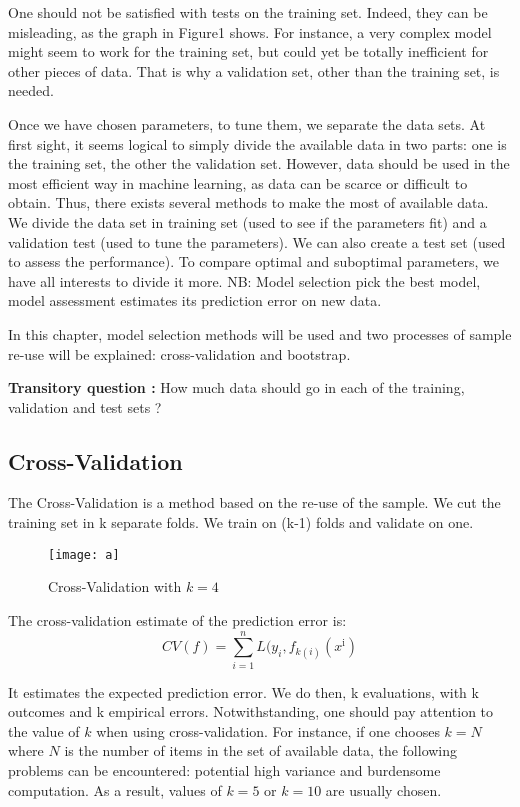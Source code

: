 \documentclass[a4paper,12pt]{article}
\begin{document}
One should not be satisfied with tests on the training set. Indeed, they can be misleading, as the graph in Figure1 shows.
For instance, a very complex model might seem to work for the training set, but could yet be totally inefficient for other pieces of data. That is why a validation set, other than the training set, is needed.

Once we have chosen parameters, to tune them, we separate the data sets.
At first sight, it seems logical to simply divide the available data in two parts: one is the training set, the other the validation set. However, data should be used in the most efficient way in machine learning, as data can be scarce or difficult to obtain. Thus, there exists several methods to make the most of available data. We divide the data set in training set (used to see if the parameters fit) and a validation test   (used to tune the parameters). We can also create a test set (used to assess the performance).
To compare optimal and suboptimal parameters, we have all interests to divide it more. 
NB: Model selection pick the best model, model assessment estimates its prediction error on new data.

In this chapter, model selection methods will be used and two processes of sample re-use will be explained: cross-validation and bootstrap.

\textbf{Transitory question :} How much data should go in each of the training, validation and test sets ?  
\subsection{Cross-Validation}
The Cross-Validation   is a method based on the re-use of the sample. We cut the training set in k separate folds. We train on (k-1) folds and validate on one. 

\begin{figure}[!h]
\centering
\texttt{[image: a]}
\caption{\label{fig:1}Cross-Validation with $k=4$}
\end{figure}

The cross-validation estimate of the prediction error is:
\[
CV(f) = \sum_{i=1}^n L(y_i,f_{k(i)}(x^{\text{i}})
\]

It estimates the expected prediction error.
We do then, k evaluations, with k outcomes and k empirical errors.  Notwithstanding, one should pay attention to the value of $k$ when using cross-validation. For instance, if one chooses $k=N$ where $N$ is the number of items in the set of available data, the following problems can be encountered: potential high variance and burdensome computation. As a result, values of $k=5$ or $k=10$ are usually chosen.
\end{document}
